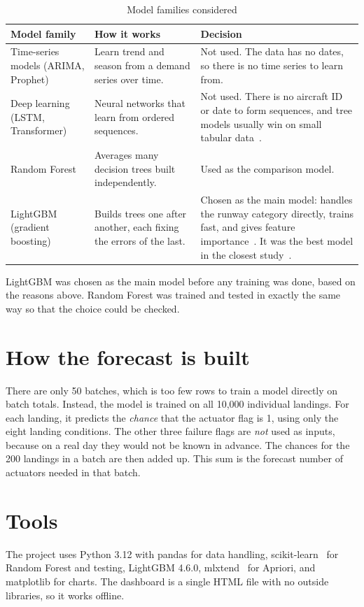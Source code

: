 \documentclass[12pt,oneside]{report}
\begin{document}
\begin{table}[htbp]
\centering\small
\caption[Model families considered]{Model families considered}
\label{tab:models}
\begin{tabularx}{\textwidth}{@{}>{\raggedright\arraybackslash}p{3.1cm}LL@{}}
\toprule
\textbf{Model family} & \textbf{How it works} & \textbf{Decision}\\
\midrule
Time-series models (ARIMA, Prophet) & Learn trend and season from a demand series over time. & Not used. The data has no dates, so there is no time series to learn from.\\
Deep learning (LSTM, Transformer) & Neural networks that learn from ordered sequences. & Not used. There is no aircraft ID or date to form sequences, and tree models usually win on small tabular data~\cite{grinsztajn2022}.\\
Random Forest & Averages many decision trees built independently. & Used as the comparison model.\\
LightGBM (gradient boosting) & Builds trees one after another, each fixing the errors of the last. & Chosen as the main model: handles the runway category directly, trains fast, and gives feature importance~\cite{ke2017}. It was the best model in the closest study~\cite{olmo2026}.\\
\bottomrule
\end{tabularx}
\end{table}

LightGBM was chosen as the main model before any training was done, based on the reasons above. Random Forest was trained and tested in exactly the same way so that the choice could be checked.

\section{How the forecast is built}
There are only 50 batches, which is too few rows to train a model directly on batch totals. Instead, the model is trained on all 10,000 individual landings. For each landing, it predicts the \emph{chance} that the actuator flag is 1, using only the eight landing conditions. The other three failure flags are \emph{not} used as inputs, because on a real day they would not be known in advance. The chances for the 200 landings in a batch are then added up. This sum is the forecast number of actuators needed in that batch.

\section{Tools}
The project uses Python 3.12 with pandas for data handling, scikit-learn~\cite{pedregosa2011} for Random Forest and testing, LightGBM 4.6.0, mlxtend~\cite{raschka2018} for Apriori, and matplotlib for charts. The dashboard is a single HTML file with no outside libraries, so it works offline.
\end{document}
